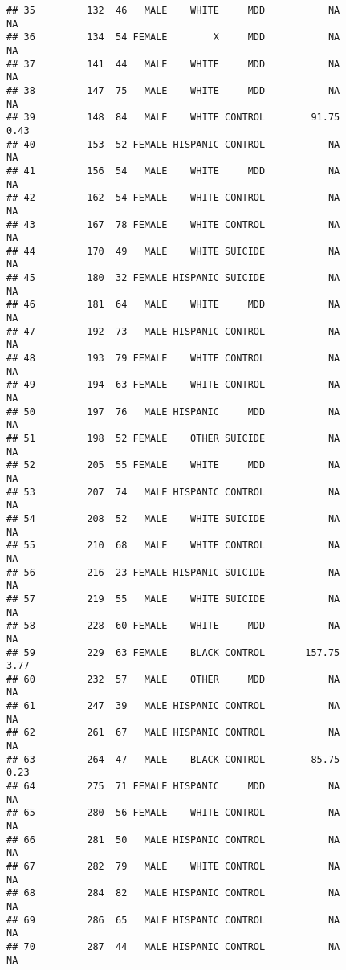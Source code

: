 \documentclass[]{article}
\begin{document}
\begin{verbatim}
## 35         132  46   MALE    WHITE     MDD           NA            NA
## 36         134  54 FEMALE        X     MDD           NA            NA
## 37         141  44   MALE    WHITE     MDD           NA            NA
## 38         147  75   MALE    WHITE     MDD           NA            NA
## 39         148  84   MALE    WHITE CONTROL        91.75          0.43
## 40         153  52 FEMALE HISPANIC CONTROL           NA            NA
## 41         156  54   MALE    WHITE     MDD           NA            NA
## 42         162  54 FEMALE    WHITE CONTROL           NA            NA
## 43         167  78 FEMALE    WHITE CONTROL           NA            NA
## 44         170  49   MALE    WHITE SUICIDE           NA            NA
## 45         180  32 FEMALE HISPANIC SUICIDE           NA            NA
## 46         181  64   MALE    WHITE     MDD           NA            NA
## 47         192  73   MALE HISPANIC CONTROL           NA            NA
## 48         193  79 FEMALE    WHITE CONTROL           NA            NA
## 49         194  63 FEMALE    WHITE CONTROL           NA            NA
## 50         197  76   MALE HISPANIC     MDD           NA            NA
## 51         198  52 FEMALE    OTHER SUICIDE           NA            NA
## 52         205  55 FEMALE    WHITE     MDD           NA            NA
## 53         207  74   MALE HISPANIC CONTROL           NA            NA
## 54         208  52   MALE    WHITE SUICIDE           NA            NA
## 55         210  68   MALE    WHITE CONTROL           NA            NA
## 56         216  23 FEMALE HISPANIC SUICIDE           NA            NA
## 57         219  55   MALE    WHITE SUICIDE           NA            NA
## 58         228  60 FEMALE    WHITE     MDD           NA            NA
## 59         229  63 FEMALE    BLACK CONTROL       157.75          3.77
## 60         232  57   MALE    OTHER     MDD           NA            NA
## 61         247  39   MALE HISPANIC CONTROL           NA            NA
## 62         261  67   MALE HISPANIC CONTROL           NA            NA
## 63         264  47   MALE    BLACK CONTROL        85.75          0.23
## 64         275  71 FEMALE HISPANIC     MDD           NA            NA
## 65         280  56 FEMALE    WHITE CONTROL           NA            NA
## 66         281  50   MALE HISPANIC CONTROL           NA            NA
## 67         282  79   MALE    WHITE CONTROL           NA            NA
## 68         284  82   MALE HISPANIC CONTROL           NA            NA
## 69         286  65   MALE HISPANIC CONTROL           NA            NA
## 70         287  44   MALE HISPANIC CONTROL           NA            NA

\end{verbatim}
\end{document}
